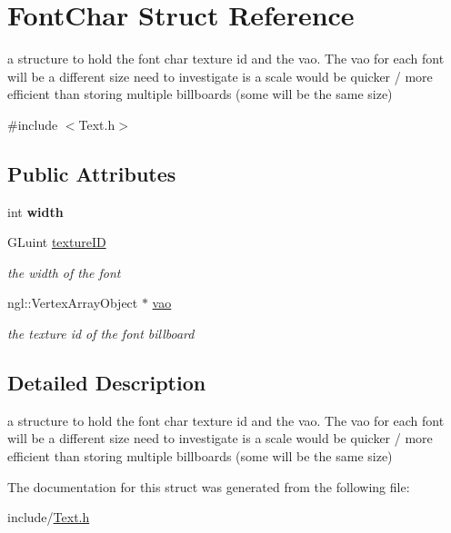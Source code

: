 \hypertarget{structFontChar}{
\section{FontChar Struct Reference}
\label{structFontChar}
}


a structure to hold the font char texture id and the vao. The vao for each font will be a different size need to investigate is a scale would be quicker / more efficient than storing multiple billboards (some will be the same size)  


{\ttfamily \#include $<$Text.h$>$}\subsection*{Public Attributes}
\begin{DoxyCompactItemize}
\item 
\hypertarget{structFontChar_ad9a465bf2576f17d4123d440d1b4a6cb}{
int {\bfseries width}}
\label{structFontChar_ad9a465bf2576f17d4123d440d1b4a6cb}

\item 
\hypertarget{structFontChar_ae1075095d8060c578b87d6437eccec2c}{
GLuint \hyperlink{structFontChar_ae1075095d8060c578b87d6437eccec2c}{textureID}}
\label{structFontChar_ae1075095d8060c578b87d6437eccec2c}

\begin{DoxyCompactList}\small\item\em the width of the font \item\end{DoxyCompactList}\item 
\hypertarget{structFontChar_a890a0845ed36a0d9aa80eff184f76230}{
ngl::VertexArrayObject $\ast$ \hyperlink{structFontChar_a890a0845ed36a0d9aa80eff184f76230}{vao}}
\label{structFontChar_a890a0845ed36a0d9aa80eff184f76230}

\begin{DoxyCompactList}\small\item\em the texture id of the font billboard \item\end{DoxyCompactList}\end{DoxyCompactItemize}


\subsection{Detailed Description}
a structure to hold the font char texture id and the vao. The vao for each font will be a different size need to investigate is a scale would be quicker / more efficient than storing multiple billboards (some will be the same size) 

The documentation for this struct was generated from the following file:\begin{DoxyCompactItemize}
\item 
include/\hyperlink{Text_8h}{Text.h}\end{DoxyCompactItemize}
